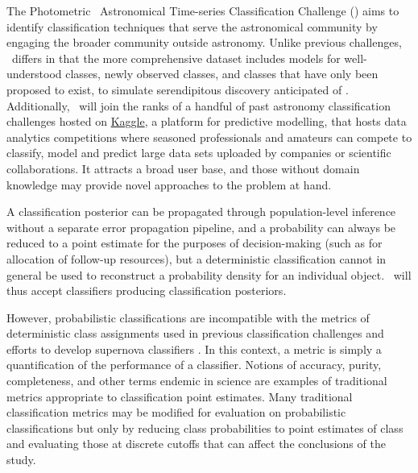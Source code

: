 The Photometric \lsst\ Astronomical Time-series Classification Challenge (\plasticc) aims to identify classification techniques that serve the astronomical community by engaging the broader community outside astronomy.
Unlike previous challenges, \plasticc\ differs in that the more comprehensive dataset includes models for well-understood classes, newly observed classes, and classes that have only been proposed to exist, to simulate serendipitous discovery anticipated of \lsst.
Additionally, \plasticc\ will join the ranks of a handful of past astronomy classification challenges hosted on \href{https://www.kaggle.com/competitions}{Kaggle}, a platform for predictive modelling, that hosts data analytics competitions where seasoned professionals and amateurs can compete to classify, model and predict large data sets uploaded by companies or scientific collaborations.
It attracts a broad user base, and those without domain knowledge may provide novel approaches to the problem at hand.

A classification posterior can be propagated through population-level inference without a separate error propagation pipeline, and a probability can always be reduced to a point estimate for the purposes of decision-making (such as for allocation of follow-up resources), but a deterministic classification cannot in general be used to reconstruct a probability density for an individual object.
\plasticc\ will thus accept classifiers producing classification posteriors.

However, probabilistic classifications are incompatible with the metrics of deterministic class assignments used in previous classification challenges \citep{kessler_supernova_2010, kessler_results_2010} and efforts to develop supernova classifiers \citep{2018ApJS..236....9N}.
In this context, a metric is simply a quantification of the performance of a classifier.
Notions of accuracy, purity, completeness, and other terms endemic in science are examples of traditional metrics appropriate to classification point estimates.
Many traditional classification metrics may be modified for evaluation on probabilistic classifications \citep{lochner_photometric_2016, moller_photometric_2016, hon_deep_2017, hon_detecting_2018, 2011arXiv1108.4696G} but only by reducing class probabilities to point estimates of class and evaluating those at discrete cutoffs that can affect the conclusions of the study.

